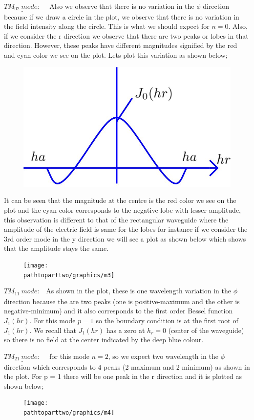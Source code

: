 $\underline{TM_{02} \ mode:}$ \ \ Also we observe that there is no variation in the $\phi$ direction because if we draw a circle in the plot, we observe that there is no variation in the field intensity along the circle. This is what we should expect for $n =0$. Also, if we consider the r direction we observe that there are two peaks or lobes in that direction. However, these peaks have different magnitudes signified by the red and cyan color we see on the plot. Lets plot this variation as shown below;
\begin{figure}[h]
\centering
\includegraphics[width=0.7\linewidth]{./graphics/m2}
\caption{}
\label{fig:m2}
\end{figure}
It can be seen that the magnitude at the centre is the red color we see on the plot and the cyan color corresponds to the negative lobe with lesser amplitude, this observation is different to that of the rectangular waveguide where the amplitude of the  electric field is same for the lobes for instance if we consider the 3rd order mode in the y direction we will see a plot as shown below which shows that the amplitude stays the same.
\begin{figure}[h]
\centering
\texttt{[image: \\pathtoparttwo/graphics/m3]}
\caption{}
\label{fig:m3}
\end{figure}
$\underline{TM_{11} \ mode:}$ \ As shown in the plot, these is one wavelength variation in the $\phi$ direction because the are two peaks (one is positive-maximum and the other is negative-minimum) and it also corresponds to the first order Bessel function $J_1(hr)$. For this mode $p =1$  so the boundary condition is at the first root of $J_1(hr).$ We recall that $J_1(hr)$ has a zero at $h_r =0$ (center of the waveguide) so there is no field  at the center indicated by the deep blue colour.

$\underline{TM_{21} \ mode:}$ \ \ for this mode $n=2$, so we expect two wavelength in the $\phi$ direction which corresponds to 4 peaks (2 maximum and 2 minimum) as shown in the plot. For  p = 1 there will be one peak in the r direction and it is plotted as shown below;
\begin{figure}[H]
\centering
\texttt{[image: \\pathtoparttwo/graphics/m4]}
\caption{}
\label{fig:m4}
\end{figure}

